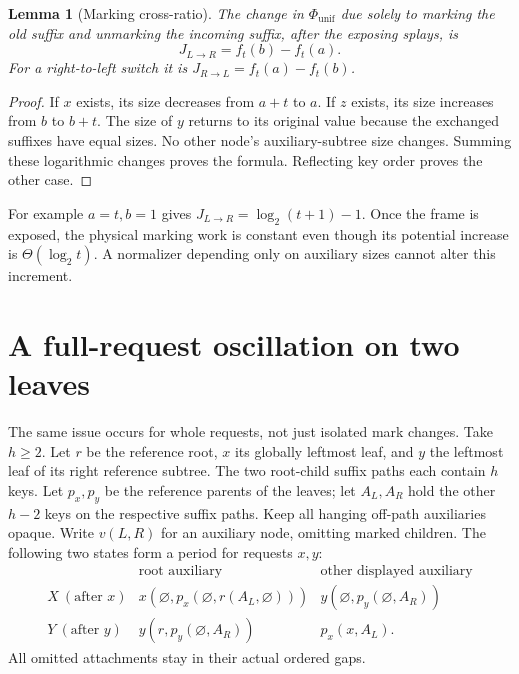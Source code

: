 \documentclass[11pt]{article}
\newtheorem{lemma}{Lemma}
\newcommand{\lgx}{\log_2}
\newcommand{\phiu}{\Phi_{\mathrm{unif}}}
\begin{document}
\begin{lemma}[Marking cross-ratio]
The change in $\phiu$ due solely to marking the old suffix and unmarking
the incoming suffix, after the exposing splays, is
\[
 J_{L\to R}=f_t(b)-f_t(a).
\]
For a right-to-left switch it is $J_{R\to L}=f_t(a)-f_t(b)$.
\end{lemma}
\begin{proof}
If $x$ exists, its size decreases from $a+t$ to $a$. If $z$ exists,
its size increases from $b$ to $b+t$. The size of $y$ returns to its
original value because the exchanged suffixes have equal sizes.
No other node's auxiliary-subtree size changes. Summing these logarithmic
changes proves the formula. Reflecting key order proves the other case.
\end{proof}

For example $a=t,b=1$ gives
$J_{L\to R}=\lgx(t+1)-1$. Once the frame is exposed, the physical
marking work is constant even though its potential increase is
$\Theta(\lgx t)$. A normalizer depending only on auxiliary sizes cannot
alter this increment.

\section{A full-request oscillation on two leaves}

The same issue occurs for whole requests, not just isolated mark changes.
Take $h\ge2$. Let $r$ be the reference root, $x$ its globally leftmost
leaf, and $y$ the leftmost leaf of its right reference subtree. The two
root-child suffix paths each contain $h$ keys. Let $p_x,p_y$ be the
reference parents of the leaves; let $A_L,A_R$ hold the other $h-2$ keys
on the respective suffix paths. Keep all hanging off-path auxiliaries
opaque. Write $v(L,R)$ for an auxiliary node, omitting marked children.
The following two states form a period for requests $x,y$:
\[
\begin{array}{c|c|c}
 &\text{root auxiliary}&\text{other displayed auxiliary}\\ \hline
 X\ (\text{after }x)&
 x(\varnothing,p_x(\varnothing,r(A_L,\varnothing)))&
 y(\varnothing,p_y(\varnothing,A_R))\\[2pt]
 Y\ (\text{after }y)&
 y(r,p_y(\varnothing,A_R))&p_x(x,A_L).
\end{array}
\]
All omitted attachments stay in their actual ordered gaps.
\end{document}
